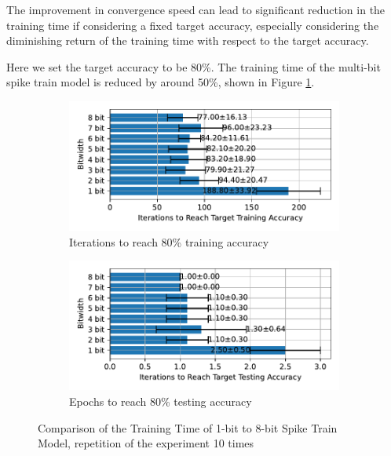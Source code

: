         The improvement in convergence speed can lead to significant reduction in the training time if considering a fixed target accuracy, especially considering the diminishing return of the training time with respect to the target accuracy. 

        Here we set the target accuracy to be 80\%. The training time of the multi-bit spike train model is reduced by around 50\%, shown in Figure \ref{fig:iterations_fixed_accuracy}. 
        \begin{figure}[!htpb]
            \centering
            \begin{subfigure}[H]{0.8\textwidth}
                \centering
                \includegraphics[width=\textwidth]{../standard/FashionMNIST/plots/fashionmnist_train_iters.pdf}
                \caption{Iterations to reach 80\% training accuracy}
            \end{subfigure}
            \hfill
            \begin{subfigure}[H]{0.8\textwidth}
                \centering
                \includegraphics[width=\textwidth]{../standard/FashionMNIST/plots/fashionmnist_test_iters.pdf}
                \caption{Epochs to reach 80\% testing accuracy}
            \end{subfigure}
            \caption{Comparison of the Training Time of 1-bit to 8-bit Spike Train Model, repetition of the experiment 10 times}
            \label{fig:iterations_fixed_accuracy}
        \end{figure}

